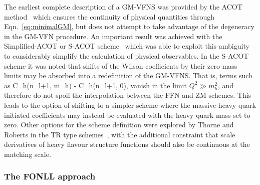The earliest complete description of a GM-VFNS was provided by the ACOT method~\cite{Collins:1978wz} which ensures the continuity of physical quantities through Eqn.~\ref{eq:minimalGM}, but does not attempt to take advantage of the degeneracy in the GM-VFN procedure. An important result was achieved with the Simplified-ACOT or S-ACOT  scheme~\cite{Collins:1998rz,Kramer:2000hn} which was able to exploit this ambiguity to considerably simplify the calculation of physical observables. In the S-ACOT scheme it was noted that shifts of the Wilson coefficients by their zero-mass limits may be absorbed into a redefinition of the GM-VFNS. That is, terms such as
\be C_h(n_l+1, m_h) - C_h(n_l+1, 0),\ee
vanish in the limit $Q^2 \gg m_h^2$, and therefore do not spoil the interpolation between the FFN and ZM schemes. This leads to the option of shifting to a simpler scheme where the massive heavy quark initiated coefficients may instead be evaluated with the heavy quark mass set to zero. Other options for the scheme definition were explored by Thorne and Roberts in the TR type schemes~\cite{Thorne:1997uu,Thorne:1997ga}, with the additional constraint that scale derivatives of heavy flavour structure functions should also be continuous at the matching scale.


\subsubsection{The FONLL approach}

